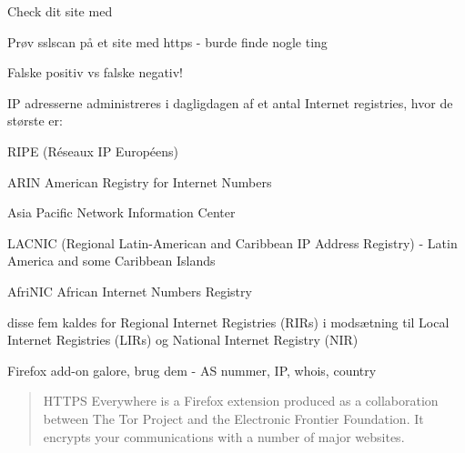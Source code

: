 \documentclass[20pt,landscape,a4paper,footrule]{foils}
\begin{document}
Check dit site med 



\begin{list1}
\item Prøv sslscan på et site med https - burde finde nogle ting
\item Falske positiv vs falske negativ!
\end{list1}



\begin{list1}
\item IP adresserne administreres i dagligdagen af et antal Internet
  registries, hvor de største er:
\begin{list2}
\item RIPE (Réseaux IP Européens)  
\item ARIN American Registry for Internet Numbers 
\item Asia Pacific Network Information Center 
\item LACNIC (Regional Latin-American and Caribbean IP Address
  Registry) - Latin America and some Caribbean Islands
\item AfriNIC African Internet Numbers Registry 
\end{list2}
\item disse fem kaldes for Regional Internet Registries (RIRs) i
  modsætning til Local Internet Registries (LIRs) og National Internet
  Registry (NIR)
\end{list1}

\vskip 1cm
\centerline{Firefox add-on galore, brug dem - AS nummer, IP, whois, country}




\begin{quote}
HTTPS Everywhere is a Firefox extension produced as a collaboration between The Tor Project and the Electronic Frontier Foundation. It encrypts your communications with a number of major websites.
\end{quote}

\centerline{}

\end{document}
